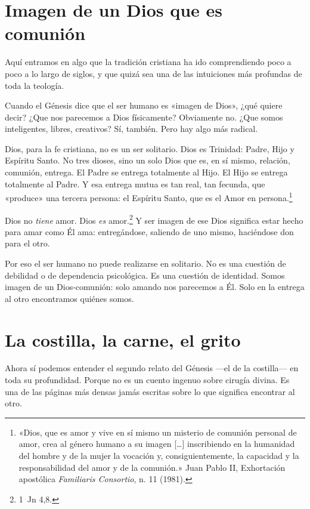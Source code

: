 \section{Imagen de un Dios que es comunión}

Aquí entramos en algo que la tradición cristiana ha ido comprendiendo poco a poco a lo largo de siglos, y que quizá sea una de las intuiciones más profundas de toda la teología.

Cuando el Génesis dice que el ser humano es «imagen de Dios», ¿qué quiere decir? ¿Que nos parecemos a Dios físicamente? Obviamente no. ¿Que somos inteligentes, libres, creativos? Sí, también. Pero hay algo más radical.

Dios, para la fe cristiana, no es un ser solitario. Dios es Trinidad: Padre, Hijo y Espíritu Santo. No tres dioses, sino un solo Dios que es, en sí mismo, relación, comunión, entrega. El Padre se entrega totalmente al Hijo. El Hijo se entrega totalmente al Padre. Y esa entrega mutua es tan real, tan fecunda, que «produce» una tercera persona: el Espíritu Santo, que es el Amor en persona.\footnote{«Dios, que es amor y vive en sí mismo un misterio de comunión personal de amor, crea al género humano a su imagen [\ldots] inscribiendo en la humanidad del hombre y de la mujer la vocación y, consiguientemente, la capacidad y la responsabilidad del amor y de la comunión.» Juan Pablo II, Exhortación apostólica \textit{Familiaris Consortio}, n. 11 (1981).}

Dios no \emph{tiene} amor. Dios \emph{es} amor.\footnote{1~Jn 4,8.} Y ser imagen de ese Dios significa estar hecho para amar como Él ama: entregándose, saliendo de uno mismo, haciéndose don para el otro.

Por eso el ser humano no puede realizarse en solitario. No es una cuestión de debilidad o de dependencia psicológica. Es una cuestión de identidad. Somos imagen de un Dios-comunión: solo amando nos parecemos a Él. Solo en la entrega al otro encontramos quiénes somos.

\section{La costilla, la carne, el grito}

Ahora sí podemos entender el segundo relato del Génesis ---el de la costilla--- en toda su profundidad. Porque no es un cuento ingenuo sobre cirugía divina. Es una de las páginas más densas jamás escritas sobre lo que significa encontrar al otro.

